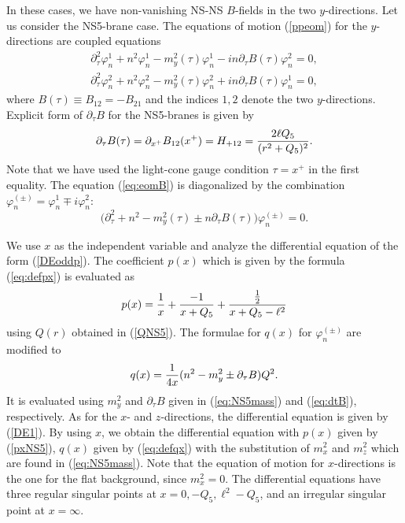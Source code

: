 \documentclass[a4paper,12pt]{article}
\begin{document}
\noindent
In these cases, we have non-vanishing NS-NS $B$-fields 
in the two $y$-directions. Let us consider the NS5-brane case. 
The equations of motion (\ref{ppeom}) for the $y$-directions
are coupled equations 
\begin{eqnarray}
\partial^{2}_{\tau} \varphi_{n}^{1} +n^{2} \varphi_{n}^{1}
-m_{y}^{2}(\tau) \varphi_{n}^{1} -i n \partial_{\tau} B(\tau)
\varphi_{n}^{2}=0,\nonumber\\
\partial^{2}_{\tau} \varphi_{n}^{2} +n^{2} \varphi_{n}^{2}
-m_{y}^{2}(\tau) \varphi_{n}^{2} +i n \partial_{\tau} B(\tau)
\varphi_{n}^{1}=0,
\label{eq:eomB}
\end{eqnarray}
where $B(\tau)\equiv B_{12}=-B_{21}$ and the indices
$1,2$ denote the two $y$-directions.
Explicit form of $\partial_\tau B$ for  the
NS5-branes is given by
\begin{equation}
\partial_{\tau} B(\tau)= \partial_{x^{+}} B_{12}(x^{+})=H_{+12}
= {2 \ell Q_{5}\over (r^{2}+Q_{5})^{2}}.
\label{eq:dtB}
\end{equation}
Note that we have used the light-cone gauge condition 
$\tau=x^{+}$ in the first equality.
The equation (\ref{eq:eomB}) is diagonalized by the combination 
$\varphi_{n}^{(\pm)}=\varphi_{n}^{1}\mp i \varphi_{n}^{2}$:
\begin{equation}
\Big( \partial^{2}_{\tau} +n^{2} -m^{2}_{y}(\tau)
\pm n \partial_{\tau} B(\tau) \Big) \varphi_{n}^{(\pm)}=0.
\label{DEwithB}
\end{equation}

We use $x$ as the independent variable and analyze the
differential equation of the form (\ref{DEoddp}). 
The coefficient $p(x)$ which is given by the formula
(\ref{eq:defpx}) is evaluated as
\begin{equation}
p(x)={1\over x}+{-1\over x+Q_{5} }
+{{1\over2}\over x+Q_{5}-\ell^2}
\label{pxNS5}
\end{equation}
using $Q(r)$ obtained in (\ref{QNS5}).
The formulae for $q(x)$ for $\varphi_{n}^{(\pm)}$ 
are modified to 
\begin{equation}
q(x)= {1\over 4x}(n^2-m_{y}^2\pm \partial_{\tau} B)Q^2.
\end{equation}
It is evaluated using $m^{2}_{y}$ and $\partial_{\tau} B$ given
in (\ref{eq:NS5mass}) and (\ref{eq:dtB}), respectively.
As for the $x$- and $z$-directions, the differential equation
is given by (\ref{DE1}). By using $x$, we obtain the differential
equation with $p(x)$  given by (\ref{pxNS5}),
$q(x)$  given by (\ref{eq:defqx}) with the substitution of
$m^{2}_{x}$ and $m^{2}_{z}$ which are
found in (\ref{eq:NS5mass}). 
Note that the equation of motion for 
$x$-directions is the one for the flat background,
since $m^{2}_{x}=0$. 
The differential equations have three regular singular
points at $x=0, -Q_{5}, \ell^2-Q_{5}$, and an irregular
singular point at $x=\infty$. 
\end{document}
